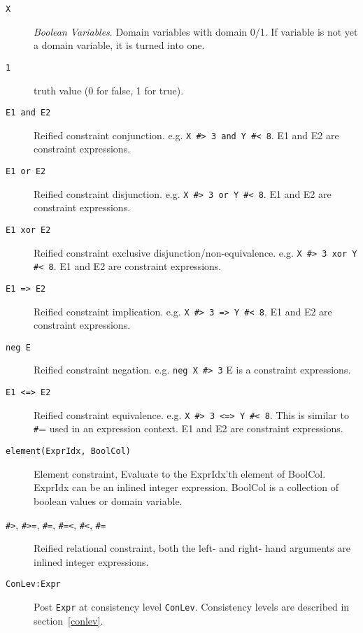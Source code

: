 \begin{description}
\item[\texttt{X}]
            \emph{Boolean Variables}.  Domain variables with domain 0/1. If variable 
	    is not yet a domain variable, it is turned into one.

\item[\texttt{1}]
            truth value (0 for false, 1 for true).


\item[\texttt{E1 and E2}]
            Reified constraint conjunction.  e.g. \verb'X #> 3 and Y #< 8'.
	    E1 and E2 are constraint expressions.

\item[\texttt{E1 or E2}]
            Reified constraint disjunction.  e.g. \verb'X #> 3 or Y #< 8'.
	    E1 and E2 are constraint expressions.

\item[\texttt{E1 xor E2}]
            Reified constraint exclusive disjunction/non-equivalence.  e.g. \verb'X #> 3 xor Y #< 8'.
	    E1 and E2 are constraint expressions.

\item[\texttt{E1 => E2}]
            Reified constraint implication.  e.g. \verb'X #> 3 => Y #< 8'.
	    E1 and E2 are constraint expressions.

\item[\texttt{neg E}]
            Reified constraint negation.  e.g. \verb'neg X #> 3'
	    E is a constraint expressions.

\item[\texttt{E1 <=> E2}]
            Reified constraint equivalence.  e.g. \verb'X #> 3 <=> Y #< 8'.
            This is similar to {\texttt \#=} used in an expression context.
	    E1 and E2 are constraint expressions.

\item[\texttt{element(ExprIdx, BoolCol)}]
            Element constraint, Evaluate to the ExprIdx'th element of BoolCol.
	    ExprIdx can be an inlined integer expression. BoolCol is a
	    collection of boolean values or domain variable.

\item[
    \texttt{\#>}, \texttt{\#>=}, \texttt{\#=}, \texttt{\#=<},
 \texttt{\#<},
    \texttt{\#\bsl=}]

    Reified relational constraint, both the left- and right- hand arguments are
    inlined integer expressions.

\item[\texttt{ConLev:Expr}]
    Post \texttt{Expr} at consistency level \texttt{ConLev}. Consistency
    levels are described in section~\ref{conlev}. 


\end{description}
